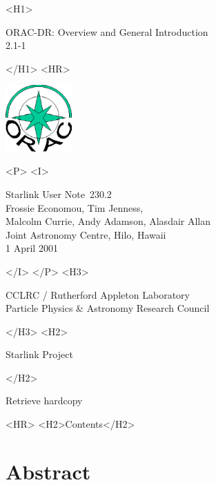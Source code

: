 \documentclass[twoside,11pt]{article}
\newcommand{\stardoccategory}  {Starlink User Note}
\newcommand{\stardocsource}    {sun\stardocnumber}
\newcommand{\stardocnumber}    {230.2}
\newcommand{\stardocauthors}   {Frossie Economou, Tim Jenness,\\ Malcolm
  Currie, Andy Adamson, Alasdair Allan\\
Joint Astronomy Centre, Hilo, Hawaii}
\newcommand{\stardocdate}      {1 April 2001}
\newcommand{\stardoctitle}     {ORAC-DR: Overview and General Introduction}
\newcommand{\stardocversion}   {2.1-1}
\newcommand{\stardocmanual}    {}
\newcommand{\htmladdnormallink}[2]{#1}
\newcommand{\htmladdimg}[1]{}
\newcommand{\htmlref}[2]{#1}
\newcommand{\htmladdtonavigation}[1]{}
\newcommand{\xlabel}[1]{}
\renewcommand{\_}{\texttt{\symbol{95}}}
\begin{document}
\begin{htmlonly}
   \xlabel{}
   \begin{rawhtml} <H1> \end{rawhtml}
      \stardoctitle\\
      \stardocversion\\
      \stardocmanual
   \begin{rawhtml} </H1> <HR> \end{rawhtml}

\includegraphics[width=1.0in]{sun230_logo.eps}

   \begin{rawhtml} <P> <I> \end{rawhtml}
   \stardoccategory\ \stardocnumber \\
   \stardocauthors \\
   \stardocdate
   \begin{rawhtml} </I> </P> <H3> \end{rawhtml}
      \htmladdnormallink{CCLRC / Rutherford Appleton Laboratory}
                        {http://www.cclrc.ac.uk} \\
      \htmladdnormallink{Particle Physics \& Astronomy Research Council}
                        {http://www.pparc.ac.uk} \\
   \begin{rawhtml} </H3> <H2> \end{rawhtml}
      \htmladdnormallink{Starlink Project}{http://www.starlink.rl.ac.uk/}
   \begin{rawhtml} </H2> \end{rawhtml}
   \htmladdnormallink{\htmladdimg{source.gif} Retrieve hardcopy}
      {http://www.starlink.rl.ac.uk/cgi-bin/hcserver?\stardocsource}\\

  \label{stardoccontents}
  \begin{rawhtml} 
    <HR>
    <H2>Contents</H2>
  \end{rawhtml}
  \htmladdtonavigation{\htmlref{\htmladdimg{contents_motif.gif}}
        {stardoccontents}}

  \section{\xlabel{abstract}Abstract}
\end{htmlonly}
\end{document}
